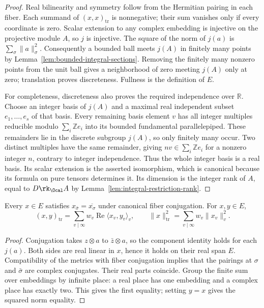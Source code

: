 \begin{proof}
Real bilinearity and symmetry follow from the Hermitian pairing in each
fiber. Each summand of $(x,x)_{\mathrm{tr}}$ is nonnegative; their sum
vanishes only if every coordinate is zero. Scalar extension to any complex
embedding is injective on the projective module $A$, so $j$ is injective.
The square of the norm of $j(a)$ is $\sum_\sigma\|a\|_\sigma^2$.
Consequently a bounded ball meets $j(A)$ in finitely many points by
Lemma~\ref{lem:bounded-integral-sections}. Removing the finitely many
nonzero points from the unit ball gives a neighborhood of zero meeting
$j(A)$ only at zero; translation proves discreteness. Fullness is the
definition of $E$.

For completeness, discreteness also proves the required independence over
$\mathbb R$. Choose an integer basis of $j(A)$ and a maximal real
independent subset $e_1,\dots,e_s$ of that basis. Every remaining basis
element $v$ has all integer multiples reducible modulo
$\sum_i\mathbb Ze_i$ into its bounded fundamental parallelepiped.
These remainders lie in the discrete subgroup $j(A)$, so only finitely many
occur. Two distinct multiples have the same remainder, giving
$nv\in\sum_i\mathbb Ze_i$ for a nonzero integer $n$, contrary to integer
independence. Thus the whole integer basis is a real basis. Its scalar
extension is the asserted isomorphism, which is canonical because its
formula on pure tensors determines it. Its dimension is the integer rank
of $A$, equal to $D\rk_\Ocal A$ by
Lemma~\ref{lem:integral-restriction-rank}.
\end{proof}

\begin{lemma}
\label{lem:trace-metric-weights}
\leanok
Every $x\in E$ satisfies $x_{\bar\sigma}=\overline{x_\sigma}$ under
canonical fiber conjugation. For $x,y\in E$,
\[
 (x,y)_{\mathrm{tr}}=\sum_{v\mid\infty} w_v
   \operatorname{Re}\langle x_v,y_v\rangle_v,
 \qquad \|x\|_{\mathrm{tr}}^2=\sum_{v\mid\infty}w_v\|x_v\|_v^2.
\]
\end{lemma}
\begin{proof}
Conjugation takes $z\otimes a$ to $\bar z\otimes a$, so the component
identity holds for each $j(a)$. Both sides are real linear in $x$, hence
it holds on their real span $E$. Compatibility of the metrics with fiber
conjugation implies that the pairings at $\sigma$ and $\bar\sigma$ are
complex conjugates. Their real parts coincide. Group the finite sum over
embeddings by infinite place: a real place has one embedding and a complex
place has exactly two. This gives the first equality; setting $y=x$
gives the squared norm equality.
\end{proof}

